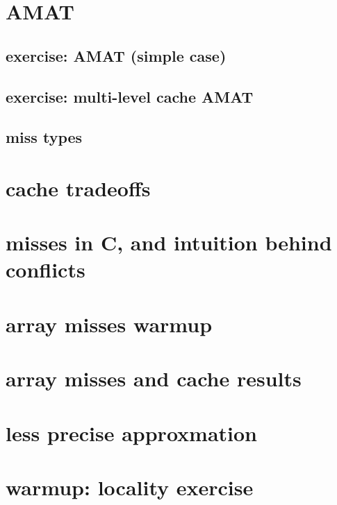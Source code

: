 \section{AMAT}


\subsection{exercise: AMAT (simple case)}


\subsection{exercise: multi-level cache AMAT}


\subsection{miss types}


\section{cache tradeoffs}


\section{misses in C, and intuition behind conflicts}


\section{array misses warmup}


\section{array misses and cache results}


\section{less precise approxmation}


\section{warmup: locality exercise}  %


